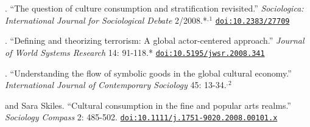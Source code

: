 
. ``The question of culture consumption and stratification revisited.'' {\em Sociologica: International Journal for Sociological Debate} 2/2008.\textcolor{uclagold}{*}$^{,}$\textcolor{uclablue}{$^{1}$} \href{https://www.rivisteweb.it/doi/10.2383/27709}{\nolinkurl{doi:10.2383/27709}} 

.  ``Defining and theorizing terrorism:  A global actor-centered approach.'' {\em Journal of World Systems Research} 14: 91-118.\textcolor{uclablue}{*} \href{https://doi.org/10.5195/jwsr.2008.341}{\nolinkurl{doi:10.5195/jwsr.2008.341}}

. ``Understanding the flow of symbolic goods in the global cultural economy.''  {\em International Journal of Contemporary Sociology} 45:  13-34.$^{,}$\textcolor{uclablue}{$^{2}$} 
   
 and Sara Skiles.  ``Cultural consumption in the fine and popular arts realms.''  {\em Sociology Compass} 2:  485-502. \href{https://doi.org/10.1111/j.1751-9020.2008.00101.x}{\nolinkurl{doi:10.1111/j.1751-9020.2008.00101.x}}
